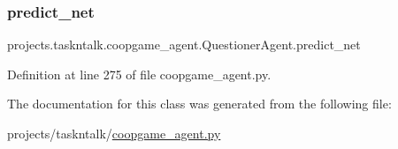 \subsubsection{\texorpdfstring{predict\+\_\+net}{predict\_net}}
{\footnotesize\ttfamily projects.\+taskntalk.\+coopgame\+\_\+agent.\+Questioner\+Agent.\+predict\+\_\+net}



Definition at line 275 of file coopgame\+\_\+agent.\+py.



The documentation for this class was generated from the following file\+:\begin{DoxyCompactItemize}
\item 
projects/taskntalk/\hyperlink{coopgame__agent_8py}{coopgame\+\_\+agent.\+py}\end{DoxyCompactItemize}
